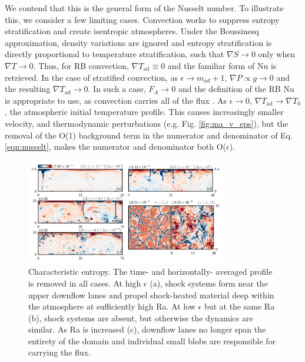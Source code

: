 \documentclass[aps, prl, twocolumn, groupedaddress, amsfonts, amssymb, amsmath]{revtex4-1}
\newcommand{\grad}{\ensuremath{\nabla}}
\begin{document}
We contend that this is the general form of the Nusselt number.  To illustrate this, we consider a few limiting
cases. Convection works to
suppress entropy stratification and create isentropic atmospheres.  Under the Boussinesq approximation,
density variations are ignored and entropy stratification is directly proportional to temperature stratification,
such that $\grad S \rightarrow 0$ only when $\grad T \rightarrow 0$.  Thus, for RB convection, 
$\grad T_{\text{ad}} \equiv 0$ and the familiar form of Nu is retrieved.  In the case of stratified convection,
as $\epsilon \rightarrow m_{ad} + 1$, $\grad P \propto g \rightarrow 0$ and
the resulting $\grad T_{\text{ad}} \rightarrow 0$.  In such a case, $F_A \rightarrow 0$ and the
definition of the RB Nu is appropriate to use, as convection carries all of the
flux \cite{brandenburg&all2005}. As $\epsilon \rightarrow 0$, 
$\grad T_{\text{ad}}\rightarrow \grad T_0$, the atmospheric initial temperature profile.  This causes increasingly
smaller velocity, and thermodynamic perturbations (e.g. Fig. \ref{fig:ma_v_eps}), but the removal of the 
O(1) background term in the numerator and denominator of Eq. \ref{eqn:nusselt}, makes the numerator and
denominator both O($\epsilon$).

\begin{figure}[b]
\includegraphics[width=3.4375in]{./figs/snapshots_fig.png}
\caption{Characteristic entropy. The time- and horizontally-
averaged profile is removed in all cases.  At high
$\epsilon$ (a), shock systems form near the upper downflow lanes and propel shock-heated material deep within
the atmosphere at sufficiently high Ra.  At low $\epsilon$ but at the same Ra (b), shock systems are absent, 
but otherwise the dynamics are similar.  As Ra is increased (c), downflow lanes no longer span
the entirety of the domain and individual small blobs are responsible for carrying the flux.
\label{fig:entropy_snapshots} }
\end{figure}
\end{document}
